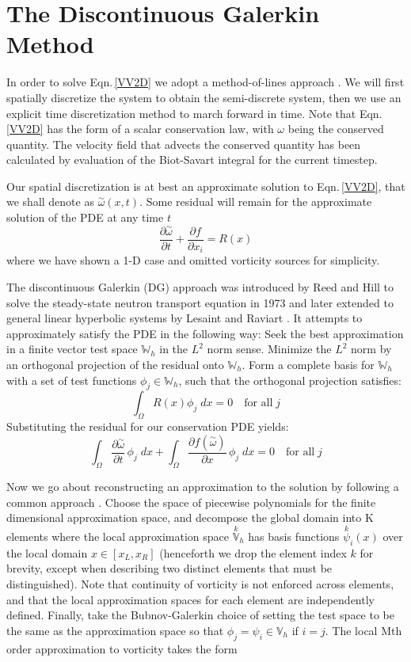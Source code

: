 \documentclass[letterpaper,12pt]{report}
\newcommand{\be}{\begin{equation}}
\newcommand{\ben}[1]{\begin{equation}\label{#1}}
\newcommand{\ee}{\end{equation}}
\newcommand{\aomega}{\overset{\sim}{\omega}}				%
\begin{document}
\section{The Discontinuous Galerkin Method}
In order to solve Eqn.\,\eqref{VV2D} we adopt a method-of-lines approach \cite{RKDG}. We will first spatially discretize the system to obtain the semi-discrete system, then we use an explicit time discretization method to march forward in time. Note that Eqn.\,\eqref{VV2D} has the form of a scalar conservation law, with $\omega$ being the conserved quantity. The velocity field that advects the conserved quantity has been calculated by evaluation of the Biot-Savart integral for the current timestep.

Our spatial discretization is at best an approximate solution to Eqn.\,\eqref{VV2D}, that we shall denote as $\aomega(x,t)$. Some residual will remain for the approximate solution of the PDE at any time $t$
\ben{VV2D} \frac{\partial \aomega}{\partial t} + \frac{\partial f}{\partial x_i} = R(x)\ee
where we have shown a 1-D case and omitted vorticity sources for simplicity.

The discontinuous Galerkin (DG) approach was introduced by Reed and Hill to solve the steady-state neutron transport equation in 1973 \cite{ReedHill} and later extended to general linear hyperbolic systems by Lesaint and Raviart \cite{Lesaint}. It attempts to approximately satisfy the PDE in the following way: Seek the best approximation in a finite vector test space $\mathbb{W}_h$  in the $L^2$ norm sense. Minimize the $L^2$ norm by an orthogonal projection of the residual onto $\mathbb{W}_h$. Form a complete basis for $\mathbb{W}_h$ with a set of test functions $\phi_j \in \mathbb{W}_h$, such that the orthogonal projection satisfies:
\be \int_\Omega R(x) \phi_j \;dx = 0 \quad\mbox{for all}\; j\ee
Substituting the residual for our conservation PDE yields:
\be \int_\Omega \frac{\partial \aomega}{\partial t} \, \phi_j \;dx + \int_\Omega \frac{\partial f(\aomega)}{\partial x} \, \phi_j \;dx = 0 \quad\mbox{for all}\; j\ee

Now we go about reconstructing an approximation to the solution by following a common approach \cite{HestWar}. Choose the space of piecewise polynomials for the finite dimensional approximation space, and decompose the global domain into K elements where the local approximation space $\overset{k}{\mathbb{V}}_h$ has basis functions $\overset{k}{\psi}_i(x)$ over the local domain $x \in [x_L, x_R]$ (henceforth we drop the element index $k$ for brevity, except when describing two distinct elements that must be distinguished). Note that continuity of vorticity is not enforced across elements, and that the local approximation spaces for each element are independently defined. Finally, take the Bubnov-Galerkin choice of setting the test space to be the same as the approximation space so that $\phi_j=\psi_i \in \mathbb{V}_h$ if $i=j$. The local Mth order approximation to vorticity takes the form
\end{document}
